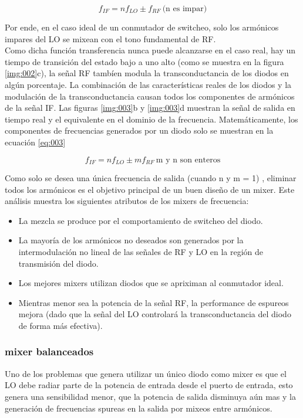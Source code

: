 \documentclass[a4paper,10pt]{article}
\begin{document}
	\begin{equation*}
		f_{IF} = nf_{LO}\pm f_{RF}~\text{(n es impar)}
	\end{equation*}

	\indent Por ende, en el caso ideal de un conmutador de switcheo, solo los 
	armónicos impares del LO se mixean con el tono fundamental de RF. \\
	\indent Como dicha función transferencia nunca puede alcanzarse en el caso 
	real, hay un tiempo de transición del estado bajo a uno alto (como se 
	muestra en la figura \ref{img:002}c), la señal RF tambíen modula la 
	transconductancia de los diodos en algún porcentaje. La combinación de las 
	características reales de los diodos y la modulación de la transconductancia
	causan todos los componentes de armónicos de la señal IF. Las figuras 
	\ref{img:003}b y \ref{img:003}d muestran la señal de salida en tiempo real y
	el equivalente en el dominio de la frecuencia. Matemáticamente, los 
	componentes de frecuencias generados por un diodo solo se muestran en la 
	ecuación \ref{eq:003}

	\begin{equation}\label{eq:003}
 		f_{IF} = n f_{LO}\pm m f_{RF}~\text{m y n son enteros}
	\end{equation}

	\indent Como solo se desea una única frecuencia de salida (cuando n y m = 1)
	, eliminar todos los armónicos es el objetivo principal de un buen diseño 
	de un mixer. Este análisis muestra los siguientes atributos de los mixers de
	frecuencia:

	\begin{itemize}
		\item La mezcla se produce por el comportamiento de switcheo del diodo.
		\item La mayoría de los armónicos no deseados son generados por la 
		intermodulación no lineal de las señales de RF y LO en la región de 
		transmisión del diodo.
		\item Los mejores mixers utilizan diodos que se apriximan al conmutador 
		ideal.
		\item Mientras menor sea la potencia de la señal RF, la performance de 
		espureos mejora (dado que la señal del LO controlará la 
		transconductancia del diodo de forma más efectiva).
	\end{itemize}

	\subsubsection{mixer balanceados}
	\indent Uno de los problemas que genera utilizar un único diodo como mixer 
	es que el LO debe radiar parte de la potencia de entrada desde el puerto de 
	entrada, esto genera una sensibilidad menor, que la potencia de salida 
	disminuya aún mas y la generación de frecuencias spureas en la salida por 
	mixeos entre armónicos. 
\end{document}
